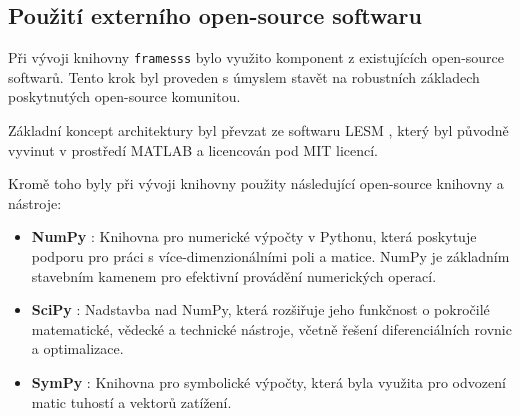 \subsection{Použití externího open-source softwaru}

Při vývoji knihovny \texttt{framesss} bylo využito komponent z existujících open-source softwarů. Tento krok byl proveden s úmyslem stavět na robustních základech poskytnutých open-source komunitou.

Základní koncept architektury byl převzat ze softwaru LESM \cite{lesm}, který byl původně vyvinut v prostředí MATLAB a licencován pod MIT licencí.

Kromě toho byly při vývoji knihovny použity následující open-source knihovny a nástroje:
\begin{itemize}
    \item \textbf{NumPy} \cite{numpy}: Knihovna pro numerické výpočty v Pythonu, která poskytuje podporu pro práci s více-dimenzionálními poli a matice. NumPy je základním stavebním kamenem pro efektivní provádění numerických operací.
    \item \textbf{SciPy} \cite{scipy}: Nadstavba nad NumPy, která rozšiřuje jeho funkčnost o pokročilé matematické, vědecké a technické nástroje, včetně řešení diferenciálních rovnic a optimalizace.
    \item \textbf{SymPy} \cite{sympy}: Knihovna pro symbolické výpočty, která byla využita pro odvození matic tuhostí a vektorů zatížení.
\end{itemize}

